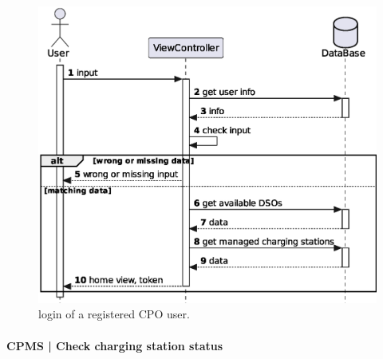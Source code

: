 \begin{figure}[h!]
    \centering
    \includegraphics[width=0.65\columnwidth]{./images/diagrams/sequences/cpms/login}
    \caption{login of a registered CPO user.}
\end{figure}

\pagebreak

\paragraph{CPMS | Check charging station status}


